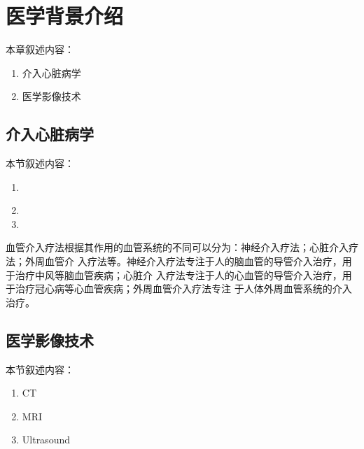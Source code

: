 \chapter{医学背景介绍}
\label{chap2}

本章叙述内容：
\begin{enumerate}
  \item 介入心脏病学
  \item 医学影像技术
\end{enumerate}

\section{介入心脏病学}

本节叙述内容：
\begin{enumerate}
  \item　
  \item
  \item
\end{enumerate}

血管介入疗法根据其作用的血管系统的不同可以分为：神经介入疗法；心脏介入疗法；外周血管介
入疗法等。神经介入疗法专注于人的脑血管的导管介入治疗，用于治疗中风等脑血管疾病；心脏介
入疗法专注于人的心血管的导管介入治疗，用于治疗冠心病等心血管疾病；外周血管介入疗法专注
于人体外周血管系统的介入治疗\cite{coles2011surveyCRaIVE}。

\section{医学影像技术}

本节叙述内容：
\begin{enumerate}
  \item CT
  \item MRI
  \item Ultrasound
\end{enumerate}
